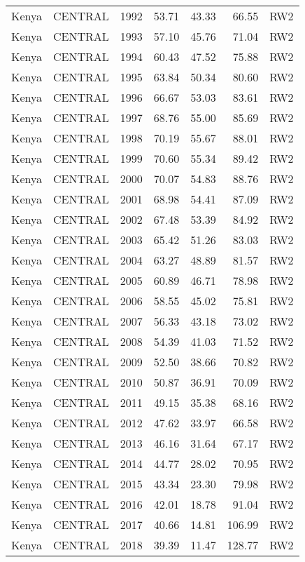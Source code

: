 \begin{longtable}{lllrrrl}
  Kenya & CENTRAL & 1992 & 53.71 & 43.33 & 66.55 & RW2 \\ 
  Kenya & CENTRAL & 1993 & 57.10 & 45.76 & 71.04 & RW2 \\ 
  Kenya & CENTRAL & 1994 & 60.43 & 47.52 & 75.88 & RW2 \\ 
  Kenya & CENTRAL & 1995 & 63.84 & 50.34 & 80.60 & RW2 \\ 
  Kenya & CENTRAL & 1996 & 66.67 & 53.03 & 83.61 & RW2 \\ 
  Kenya & CENTRAL & 1997 & 68.76 & 55.00 & 85.69 & RW2 \\ 
  Kenya & CENTRAL & 1998 & 70.19 & 55.67 & 88.01 & RW2 \\ 
  Kenya & CENTRAL & 1999 & 70.60 & 55.34 & 89.42 & RW2 \\ 
  Kenya & CENTRAL & 2000 & 70.07 & 54.83 & 88.76 & RW2 \\ 
  Kenya & CENTRAL & 2001 & 68.98 & 54.41 & 87.09 & RW2 \\ 
  Kenya & CENTRAL & 2002 & 67.48 & 53.39 & 84.92 & RW2 \\ 
  Kenya & CENTRAL & 2003 & 65.42 & 51.26 & 83.03 & RW2 \\ 
  Kenya & CENTRAL & 2004 & 63.27 & 48.89 & 81.57 & RW2 \\ 
  Kenya & CENTRAL & 2005 & 60.89 & 46.71 & 78.98 & RW2 \\ 
  Kenya & CENTRAL & 2006 & 58.55 & 45.02 & 75.81 & RW2 \\ 
  Kenya & CENTRAL & 2007 & 56.33 & 43.18 & 73.02 & RW2 \\ 
  Kenya & CENTRAL & 2008 & 54.39 & 41.03 & 71.52 & RW2 \\ 
  Kenya & CENTRAL & 2009 & 52.50 & 38.66 & 70.82 & RW2 \\ 
  Kenya & CENTRAL & 2010 & 50.87 & 36.91 & 70.09 & RW2 \\ 
  Kenya & CENTRAL & 2011 & 49.15 & 35.38 & 68.16 & RW2 \\ 
  Kenya & CENTRAL & 2012 & 47.62 & 33.97 & 66.58 & RW2 \\ 
  Kenya & CENTRAL & 2013 & 46.16 & 31.64 & 67.17 & RW2 \\ 
  Kenya & CENTRAL & 2014 & 44.77 & 28.02 & 70.95 & RW2 \\ 
  Kenya & CENTRAL & 2015 & 43.34 & 23.30 & 79.98 & RW2 \\ 
  Kenya & CENTRAL & 2016 & 42.01 & 18.78 & 91.04 & RW2 \\ 
  Kenya & CENTRAL & 2017 & 40.66 & 14.81 & 106.99 & RW2 \\ 
  Kenya & CENTRAL & 2018 & 39.39 & 11.47 & 128.77 & RW2 \\ 

\end{longtable}
